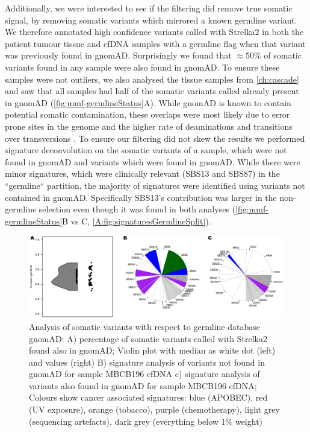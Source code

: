Additionally, we were interested to see if the filtering did remove true somatic signal, by removing somatic variants which mirrored a known germline variant. We therefore annotated high confidence variants called with Strelka2 in both the patient tumour tissue and cfDNA samples with a germline flag when that variant was previously found in gnomAD. Surprisingly we found that $\approx 50\%$ of somatic variants found in any sample were also found in gnomAD. To ensure these samples were not outliers, we also analysed the tissue samples from \autoref{ch:cascade} and saw that all samples had half of the somatic variants called already present in gnomAD (\autoref{fig:mmf-germlineStatus}A). While gnomAD is known to contain potential somatic contamination, these overlaps were most likely due to error prone sites in the genome and the higher rate of deaminations and transitions over transversions \cite{Meyerson2020}. To ensure our filtering did not skew the results we performed signature deconvolution on the somatic variants of a sample, which were not found in gnomAD and variants which were found in gnomAD. While there were minor signatures, which were clinically relevant (SBS13 and SBS87) in the ``germline`` partition, the majority of signatures were identified using variants not contained in gnomAD. Specifically SBS13's contribution was larger in the non-germline selection even though it was found in both analyses (\autoref{fig:mmf-germlineStatus}B vs C, \autoref{A:fig:signaturesGermlineSplit}).

\begin{figure}[ht]
\centering
\includegraphics[width=.99\linewidth]{Figures/MisMatchFinder/somaticVarsInGermlineSites.pdf}
\caption[Somatic variants found in germline sites]{Analysis of somatic variants with respect to germline database gnomAD: A) percentage of somatic variants called with Strelka2 found also in gnomAD; Violin plot with median as white dot (left) and values (right)  B) signature analysis of variants not found in gnomAD for sample MBCB196 cfDNA c) signature analysis of variants also found in gnomAD for sample MBCB196 cfDNA; Colours show cancer associated signatures: blue (APOBEC), red (UV exposure), orange (tobacco), purple (chemotherapy), light grey (sequencing artefacts), dark grey (everything below 1\% weight)}\label{fig:mmf-germlineStatus}
\end{figure}
  



